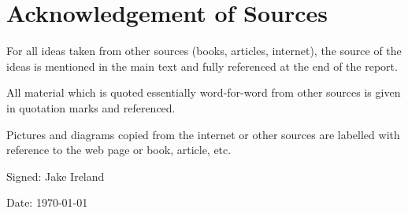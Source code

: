 \thispagestyle{empty}
\section*{Acknowledgement of Sources}

For all ideas taken from other sources (books, articles, internet), the source of the ideas is mentioned in the main text and fully referenced at the end of the report.

All material which is quoted essentially word-for-word from other sources is given in quotation marks and referenced.

Pictures and diagrams copied from the internet or other sources are labelled with reference to the web page or book, article, etc.

\vspace{1cm}

Signed: Jake Ireland

Date: \today